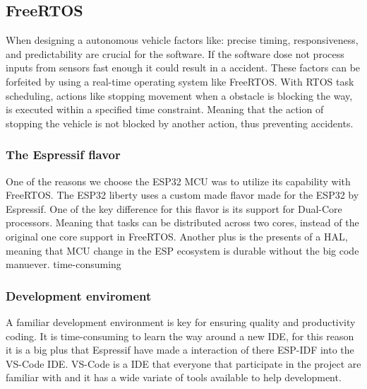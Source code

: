 \documentclass[../report.tex]{subfiles}
\begin{document}
    \subsection{FreeRTOS}
    When designing a autonomous vehicle factors like: precise timing,
    responsiveness, and predictability are crucial for the software.
    If the software dose not process inputs from sensors fast enough it could
    result in a accident. These factors can be forfeited by using a real-time
    operating system like FreeRTOS. With RTOS task scheduling, actions like
    stopping movement when a obstacle is blocking the way, is executed within a
    specified time constraint. Meaning that the action of stopping the vehicle
    is not blocked by another action, thus preventing accidents.

    \subsubsection{The Espressif flavor}
    One of the reasons we choose the ESP32 MCU was to utilize its capability
    with FreeRTOS. The ESP32 liberty uses a custom made flavor made for the
    ESP32 by Espressif. One of the key difference for this flavor is its
    support for Dual-Core processors. Meaning that tasks can be distributed
    across two cores, instead of the original one core support in FreeRTOS.
    Another plus is the presents of a HAL, meaning that MCU change in the
    ESP ecosystem is durable without the big code manuever.
    time-consuming
    \subsubsection{Development enviroment}
    A familiar development environment is key for ensuring quality and
    productivity coding. It is time-consuming to learn the way around a new
    IDE, for this reason it is a big plus that Espressif have made a
    interaction of there ESP-IDF into the VS-Code IDE. VS-Code is a IDE that
    everyone that participate in the project are familiar with and it has a
    wide variate of tools available to help development.
\end{document}
